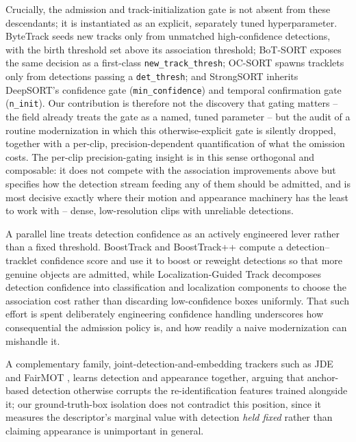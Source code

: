 Crucially, the admission and track-initialization gate is not absent from these descendants; it is instantiated as an explicit, separately tuned hyperparameter. ByteTrack \cite{zhang2022bytetrack} seeds new tracks only from unmatched high-confidence detections, with the birth threshold set above its association threshold; BoT-SORT \cite{aharon2022botsort} exposes the same decision as a first-class \texttt{new\_track\_thresh}; OC-SORT \cite{cao2023ocsort} spawns tracklets only from detections passing a \texttt{det\_thresh}; and StrongSORT \cite{du2023strongsort} inherits DeepSORT's confidence gate (\texttt{min\_confidence}) and temporal confirmation gate (\texttt{n\_init}). Our contribution is therefore not the discovery that gating matters -- the field already treats the gate as a named, tuned parameter -- but the audit of a routine modernization in which this otherwise-explicit gate is silently dropped, together with a per-clip, precision-dependent quantification of what the omission costs. The per-clip precision-gating insight is in this sense orthogonal and composable: it does not compete with the association improvements above but specifies how the detection stream feeding any of them should be admitted, and is most decisive exactly where their motion and appearance machinery has the least to work with -- dense, low-resolution clips with unreliable detections.

A parallel line treats detection confidence as an actively engineered lever rather than a fixed threshold. BoostTrack \cite{stanojevic2024boosttrack} and BoostTrack++ \cite{stanojevic2025boosttrackpp} compute a detection--tracklet confidence score and use it to boost or reweight detections so that more genuine objects are admitted, while Localization-Guided Track \cite{meng2023lgtrack} decomposes detection confidence into classification and localization components to choose the association cost rather than discarding low-confidence boxes uniformly. That such effort is spent deliberately engineering confidence handling underscores how consequential the admission policy is, and how readily a naive modernization can mishandle it.

A complementary family, joint-detection-and-embedding trackers such as JDE \cite{wang2020jde} and FairMOT \cite{zhang2021fairmot}, learns detection and appearance together, arguing that anchor-based detection otherwise corrupts the re-identification features trained alongside it; our ground-truth-box isolation does not contradict this position, since it measures the descriptor's marginal value with detection \emph{held fixed} rather than claiming appearance is unimportant in general.

